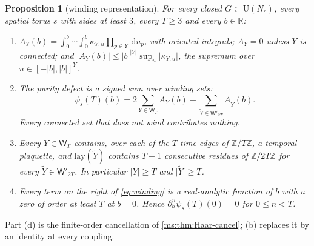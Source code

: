 \documentclass[11pt,a4paper]{amsart}
\newtheorem{proposition}[theorem]{Proposition}
\theoremstyle{definition}
\theoremstyle{remark}
\numberwithin{equation}{section}
\newcommand{\R}{\mathbb{R}}          %
\newcommand{\Z}{\mathbb{Z}}          %
\newcommand{\abs}[1]{\lvert #1\rvert}      %
\newcommand{\dd}{\,\mathrm{d}}             %
\newcommand{\U}{\mathrm{U}}                %
\newcommand{\psiT}[2]{\psi_{#1}(#2)}       %
\begin{document}
\begin{proposition}[winding representation]\label{prop:winding}
For every closed $G\subset\U(N_c)$, every spatial torus $s$ with sides at least $3$, every $T\ge3$ and every $b\in\R$:
\begin{enumerate}[label=(\alph*)]
\item $A_Y(b)=\int_0^b\!\cdots\!\int_0^b\kappa_{Y,u}\prod_{p\in Y}\dd u_p$, with oriented integrals; $A_Y=0$ unless $Y$ is connected; and $\abs{A_Y(b)}\le\abs{b}^{\abs{Y}}\sup_u\abs{\kappa_{Y,u}}$, the supremum over $u\in[-\abs{b},\abs{b}]^Y$.
\item The purity defect is a signed sum over winding sets:
\begin{equation}\label{eq:winding}
\psiT{s}{T}(b)=2\sum_{Y\in\mathsf W_T}A_Y(b)-\sum_{\tilde Y\in\mathsf W'_{2T}}A_{\tilde Y}(b).
\end{equation}
Every connected set that does not wind contributes nothing.
\item Every $Y\in\mathsf W_T$ contains, over each of the $T$ time edges of $\Z/T\Z$, a temporal plaquette, and $\mathrm{lay}(\tilde Y)$ contains $T+1$ consecutive residues of $\Z/2T\Z$ for every $\tilde Y\in\mathsf W'_{2T}$. In particular $\abs{Y}\ge T$ and $\abs{\tilde Y}\ge T$.
\item Every term on the right of \eqref{eq:winding} is a real-analytic function of $b$ with a zero of order at least $T$ at $b=0$. Hence $\partial_b^n\psiT{s}{T}(0)=0$ for $0\le n<T$.
\end{enumerate}
\end{proposition}

Part (d) is the finite-order cancellation of \cref{ms:thm:Haar-cancel}; (b) replaces it by an identity at every coupling.
\end{document}
